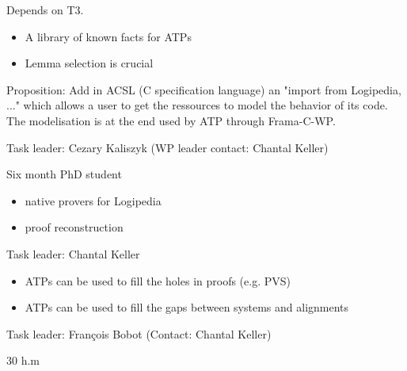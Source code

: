 \begin{workpackage}
\begin{tasklist}
\begin{task}[id=library, title=Logipedia as a source of knowledge for ATP]
  
Depends on T3.

\begin{itemize}
\item A library of known facts for ATPs
\item Lemma selection is crucial
\end{itemize}

Proposition: Add in ACSL (C specification language) an "import from
Logipedia, ..." which allows a user to get the ressources to model the
behavior of its code. The modelisation is at the end used by ATP through
Frama-C-WP.

\end{task}


\begin{task}[id=reconstruction, title=ATPs for Logipedia]
  Task leader: Cezary Kaliszyk (WP leader contact: Chantal Keller)


  Six month PhD student

\begin{itemize}
\item native provers for Logipedia
\item proof reconstruction
\end{itemize}

\end{task}


\begin{task}[id=readiness, title=Using ATPs to increase Logipedia readiness]
  Task leader: Chantal Keller


\begin{itemize}
\item ATPs can be used to fill the holes in proofs (e.g. PVS)
\item ATPs can be used to fill the gaps between systems and alignments
\end{itemize}

\end{task}


\begin{task}[id=cooperation, title=Make ATPs cooperate]
  Task leader: François Bobot (Contact: Chantal Keller)

  30 h.m



\end{task}
\end{tasklist}
\end{workpackage}
